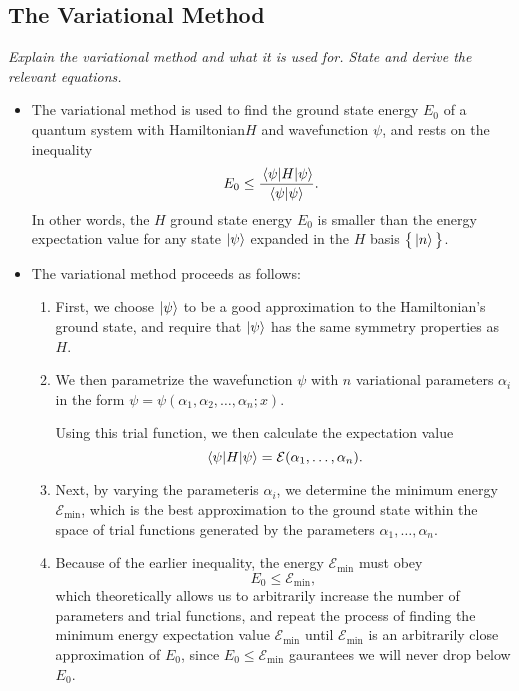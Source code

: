 \documentclass[11pt, a4paper]{article}
\newcommand{\Ham}{Hamiltonian\xspace}
\begin{document}
\subsection{The Variational Method}
\textit{Explain the variational method and what it is used for. State and derive the relevant equations.}

\begin{itemize}

    \item The variational method is used to find the ground state energy $ E_{0} $ of a quantum system with \Ham $ H $ and wavefunction $ \psi $, and rests on the inequality
    \begin{equation*}
        E_{0} \leq \frac{\mel{\psi}{H}{\psi}}{\braket{\psi}{\psi}}.
    \end{equation*}
    In other words, the $ H $ ground state energy $ E_{0} $ is smaller than the energy expectation value for any state $ \ket{\psi} $ expanded in the $ H $ basis $ \big\{ \ket{n} \big\} $.
    
    \item The variational method proceeds as follows:
    \begin{enumerate}
        \item First, we choose $ \ket{\psi} $ to be a good approximation to the \Ham's ground state, and require that $ \ket{\psi} $ has the same symmetry properties as $ H $. 

        \item We then parametrize the wavefunction $ \psi $ with $ n $ variational parameters $ \alpha_{i} $ in the form $ \psi = \psi(\alpha_{1}, \alpha_{2}, \ldots, \alpha_{n}; x) $. 

        Using this trial function, we then calculate the expectation value 
        \begin{equation*}
            \mel{\psi}{H}{\psi} = \mathcal{E}(\alpha_{1}, \ldots, \alpha_{n}).
        \end{equation*}

        \item Next, by varying the parameteris $ \alpha_{i} $, we determine the minimum energy $ \mathcal{E}_{\text{min}} $, which is the best approximation to the ground state within the space of trial functions generated by the parameters $ \alpha_{1}, \ldots, \alpha_{n} $. 
        
        \item Because of the earlier inequality, the energy $ \mathcal{E}_{\text{min}} $ must obey
        \begin{equation*}
            E_{0} \leq \mathcal{E}_{\text{min}},
        \end{equation*}
        which theoretically allows us to arbitrarily increase the number of parameters and trial functions, and repeat the process of finding the minimum energy expectation value $ \mathcal{E}_{\text{min}} $ until $ \mathcal{E}_{\text{min}} $ is an arbitrarily close approximation of $ E_{0} $, since $ E_{0} \leq \mathcal{E}_{\text{min}} $ gaurantees we will never drop below $ E_{0} $.
    \end{enumerate}
    

\end{itemize}
\end{document}
